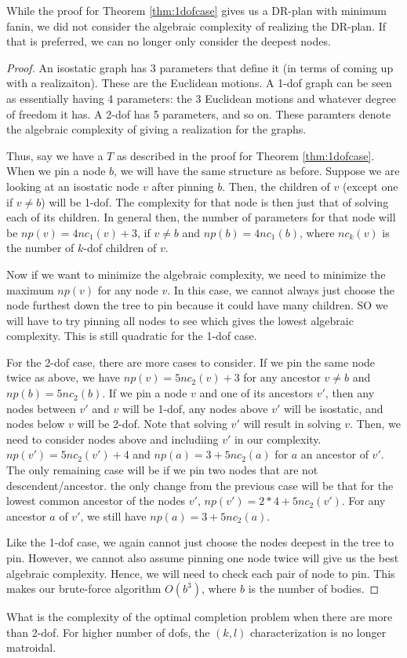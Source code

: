 \begin{observation}
    While the proof for Theorem \ref{thm:1dofcase} gives us a DR-plan with minimum fanin, we did not consider the algebraic complexity of realizing the DR-plan. If that is preferred, we can no longer only consider the deepest nodes. 
\end{observation}

\begin{proof}
    An isostatic graph has 3 parameters that define it (in terms of coming up with a realizaiton). These are the Euclidean motions. A 1-dof graph can be seen as essentially having 4 parameters: the 3 Euclidean motions and whatever degree of freedom it has. A 2-dof has 5 parameters, and so on. These paramters denote the algebraic complexity of giving a realization for the graphs. 

    Thus, say we have a $T$ as described in the proof for Theorem \ref{thm:1dofcase}. When we pin a node $b$, we will have the same structure as before. Suppose we are looking at an isostatic node $v$ after pinning $b$. Then, the children of $v$ (except one if $v \neq b$) will be 1-dof. The complexity for that node is then just that of solving each of its children. In general then, the number of parameters for that node will be $np(v) = 4nc_1(v)+3$, if $v \neq b$ and $np(b) = 4nc_1(b)$, where $nc_k(v)$ is the number of $k$-dof children of $v$. 

    Now if we want to minimize the algebraic complexity, we need to minimize the maximum $np(v)$ for any node $v$. In this case, we cannot always just choose the node furthest down the tree to pin because it could have many children. SO we will have to try pinning all nodes to see which gives the lowest algebraic complexity. This is still quadratic for the 1-dof case.

    For the 2-dof case, there are more cases to consider. If we pin the same node twice as above, we have $np(v) = 5nc_2(v)+3$ for any ancestor $v \neq b$ and $np(b) = 5nc_2(b)$. If we pin a node $v$ and one of its ancestors $v'$, then any nodes between $v'$ and $v$ will be 1-dof, any nodes above $v'$ will be isostatic, and nodes below $v$ will be 2-dof. Note that solving $v'$ will result in solving $v$. Then, we need to consider nodes above and includiing $v'$ in our complexity. $np(v') = 5nc_2(v') + 4$ and $np(a) = 3 + 5nc_2(a)$ for $a$ an ancestor of $v'$. The only remaining case will be if we pin two nodes that are not descendent/ancestor. the only change from the previous case will be that for the lowest common ancestor of the nodes $v'$, $np(v') = 2*4+5nc_2(v')$. For any ancestor $a$ of $v'$, we still have $np(a) = 3 + 5nc_2(a)$.

    Like the 1-dof case, we again cannot just choose the nodes deepest in the tree to pin. However, we cannot also assume pinning one node twice will give us the best algebraic complexity. Hence, we will need to check each pair of node to pin. This makes our brute-force algorithm $O(b^3)$, where $b$ is the number of bodies. 
\end{proof}

\begin{openproblem}
    What is the complexity of the optimal completion problem when there are more than 2-dof. For higher number of dofs, the $(k,l)$ characterization is no longer matroidal.
\end{openproblem}
